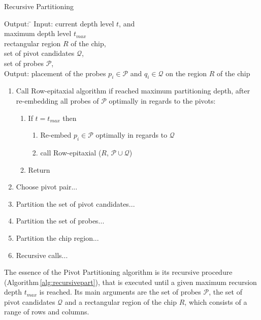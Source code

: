 \documentclass[runningheads]{llncs}
\begin{document}
\begin{algorithm}
\caption{Recursive Partitioning}
\label{alg:recursivepart}
\begin{minipage}{4.8in}

\begin{tabbing}
Output: \=									\kill
Input:  \> current depth level $t$, and						\\
        \> maximum depth level $t_{max}$					\\
        \> rectangular region $R$ of the chip,					\\
        \> set of pivot candidates $\mathcal{Q}$,				\\
        \> set of probes $\mathcal{P}$,						\\
Output: \> placement of the probes $p_i \in \mathcal{P}$ and
           $q_i \in \mathcal{Q}$ on the region $R$ of the chip
\end{tabbing}

\begin{enumerate}
\item Call Row-epitaxial algorithm if reached maximum partitioning depth,
after re-embedding all probes of $\mathcal{P}$ optimally in regards to the
pivots:
  \begin{enumerate}
  \item If $t = t_{max}$ then
  \begin{enumerate}
    \item Re-embed $p_i \in \mathcal{P}$ optimally in regards to $\mathcal{Q}$
    \item call Row-epitaxial ($R$, $\mathcal{P} \cup \mathcal{Q}$)
  \end{enumerate}
  \item Return
  \end{enumerate}
\item Choose pivot pair...
\item Partition the set of pivot candidates...
\item Partition the set of probes...
\item Partition the chip region...
\item Recursive calls...
\end{enumerate}

\end{minipage}
\end{algorithm}

The essence of the Pivot Partitioning algorithm is its recursive procedure
(Algorithm\,\ref{alg:recursivepart}), that is executed until a given maximum
recursion depth $t_{max}$ is reached. Its main arguments are the set of probes
$\mathcal{P}$, the set of pivot candidates $\mathcal{Q}$ and a rectangular region
of the chip $R$, which consists of a range of rows and columns.
\end{document}
